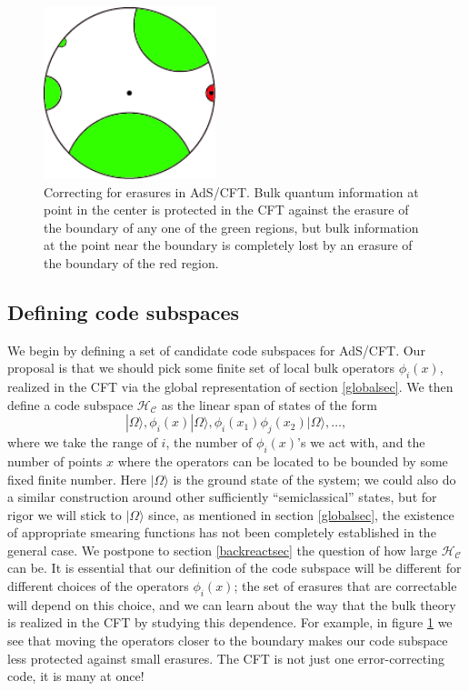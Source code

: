 \documentclass[11pt]{article}
\newcommand{\be}{\begin{equation}}
\newcommand{\ee}{\end{equation}}
\newcommand{\HC}{\mathcal{H}_{\mathcal{C}}}
\newcommand{\ran}{\rangle}
\begin{document}
\begin{figure}
\begin{center}
\includegraphics[height=5cm]{erasures.pdf}
\caption{Correcting for erasures in AdS/CFT.  Bulk quantum information at point in the center is protected in the CFT against the erasure of the boundary of any one of the green regions, but bulk information at the point near the boundary is completely lost by an erasure of the boundary of the red region.}\label{erasures}
\end{center}
\end{figure}

\subsection{Defining code subspaces}
We begin by defining a set of candidate code subspaces for AdS/CFT. Our proposal is that we should pick some finite set of local bulk operators $\phi_i(x)$, realized in the CFT via the global representation of section \ref{globalsec}.  We then define a code subspace $\HC$ as the linear span of states of the form
\be\label{bulkcode}
|\Omega\ran, \phi_i(x)|\Omega\ran, \phi_i(x_1)\phi_j(x_2)|\Omega\ran,\ldots,
\ee
where we take the range of $i$, the number of $\phi_i(x)$'s we act with, and the number of points $x$ where the operators can be located to be bounded by some fixed finite number.  Here $|\Omega\ran$ is the ground state of the system; we could also do a similar construction around other sufficiently ``semiclassical'' states, but for rigor we will stick to $|\Omega\ran$ since, as mentioned in section \ref{globalsec}, the existence of appropriate smearing functions has not been completely established in the general case.  We postpone to section \ref{backreactsec} the question of how large $\HC$ can be.  It is essential that our definition of the code subspace will be different for different choices of the operators $\phi_i(x)$; the set of erasures that are correctable will depend on this choice, and we can learn about the way that the bulk theory is realized in the CFT by studying this dependence.  For example, in figure \ref{erasures} we see that moving the operators closer to the boundary makes our code subspace less protected against small erasures.  The CFT is not just one error-correcting code, it is many at once!  
\end{document}
